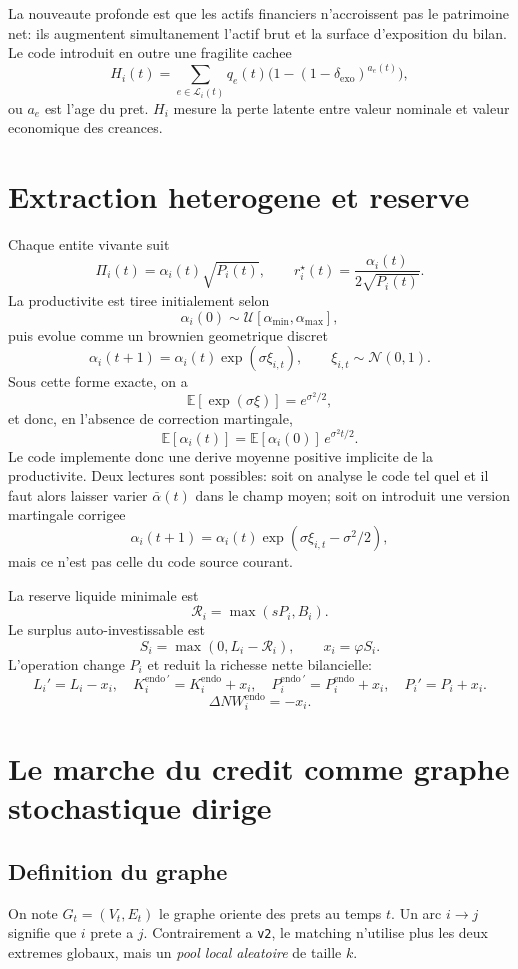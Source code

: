 \documentclass[11pt,a4paper]{article}
\begin{document}
La nouveaute profonde est que les actifs financiers n'accroissent pas le patrimoine net: ils augmentent simultanement l'actif brut et la surface d'exposition du bilan. Le code introduit en outre une fragilite cachee
\[
H_i(t)=\sum_{e \in \mathcal{L}_i(t)} q_e(t)\Big(1-(1-\delta_{\mathrm{exo}})^{a_e(t)}\Big),
\]
ou $a_e$ est l'age du pret. $H_i$ mesure la perte latente entre valeur nominale et valeur economique des creances.

\section{Extraction heterogene et reserve}
Chaque entite vivante suit
\[
\Pi_i(t)=\alpha_i(t)\sqrt{P_i(t)},
\qquad
r_i^\star(t)=\frac{\alpha_i(t)}{2\sqrt{P_i(t)}}.
\]
La productivite est tiree initialement selon
\[
\alpha_i(0)\sim \mathcal{U}[\alpha_{\min},\alpha_{\max}],
\]
puis evolue comme un brownien geometrique discret
\[
\alpha_i(t+1)=\alpha_i(t)\exp(\sigma \xi_{i,t}),
\qquad \xi_{i,t}\sim \mathcal N(0,1).
\]
Sous cette forme exacte, on a
\[
\mathbb E[\exp(\sigma \xi)] = e^{\sigma^2/2},
\]
et donc, en l'absence de correction martingale,
\[
\mathbb E[\alpha_i(t)] = \mathbb E[\alpha_i(0)]\,e^{\sigma^2 t/2}.
\]
Le code implemente donc une derive moyenne positive implicite de la productivite. Deux lectures sont possibles: soit on analyse le code tel quel et il faut alors laisser varier $\bar \alpha(t)$ dans le champ moyen; soit on introduit une version martingale corrigee
\[
\alpha_i(t+1)=\alpha_i(t)\exp(\sigma \xi_{i,t}-\sigma^2/2),
\]
mais ce n'est pas celle du code source courant.

La reserve liquide minimale est
\[
\mathcal R_i = \max(sP_i,B_i).
\]
Le surplus auto-investissable est
\[
S_i = \max(0,L_i-\mathcal R_i),
\qquad
x_i=\varphi S_i.
\]
L'operation change $P_i$ et reduit la richesse nette bilancielle:
\[
L_i' = L_i-x_i,\quad
K_i^{\mathrm{endo}\,'}=K_i^{\mathrm{endo}}+x_i,\quad
P_i^{\mathrm{endo}\,'}=P_i^{\mathrm{endo}}+x_i,\quad
P_i'=P_i+x_i.
\]
\[
\Delta NW_i^{\mathrm{endo}} = -x_i.
\]

\section{Le marche du credit comme graphe stochastique dirige}
\subsection{Definition du graphe}
On note $G_t=(V_t,E_t)$ le graphe oriente des prets au temps $t$. Un arc $i\to j$ signifie que $i$ prete a $j$. Contrairement a \texttt{v2}, le matching n'utilise plus les deux extremes globaux, mais un \emph{pool local aleatoire} de taille $k$.
\end{document}
